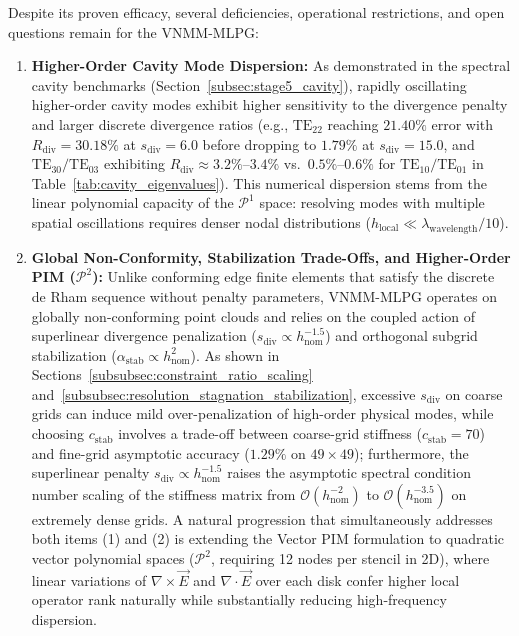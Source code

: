 \documentclass[preprint,12pt]{elsarticle}
\begin{document}
Despite its proven efficacy, several deficiencies, operational restrictions, and open questions remain for the VNMM-MLPG:
\begin{enumerate}
    \item \textbf{Higher-Order Cavity Mode Dispersion:} As demonstrated in the spectral cavity benchmarks (Section~\ref{subsec:stage5_cavity}), rapidly oscillating higher-order cavity modes exhibit higher sensitivity to the divergence penalty and larger discrete divergence ratios (e.g., $\mathrm{TE}_{22}$ reaching $21.40\%$ error with $R_{\mathrm{div}} = 30.18\%$ at $s_{\mathrm{div}} = 6.0$ before dropping to $1.79\%$ at $s_{\mathrm{div}} = 15.0$, and $\mathrm{TE}_{30}/\mathrm{TE}_{03}$ exhibiting $R_{\mathrm{div}} \approx 3.2\%\text{--}3.4\%$ vs.\ $0.5\%\text{--}0.6\%$ for $\mathrm{TE}_{10}/\mathrm{TE}_{01}$ in Table~\ref{tab:cavity_eigenvalues}). This numerical dispersion stems from the linear polynomial capacity of the $\mathcal{P}^1$ space: resolving modes with multiple spatial oscillations requires denser nodal distributions ($h_{\mathrm{local}} \ll \lambda_{\mathrm{wavelength}} / 10$).
    \item \textbf{Global Non-Conformity, Stabilization Trade-Offs, and Higher-Order PIM ($\mathcal{P}^2$):} Unlike conforming edge finite elements that satisfy the discrete de Rham sequence without penalty parameters, VNMM-MLPG operates on globally non-conforming point clouds and relies on the coupled action of superlinear divergence penalization ($s_{\mathrm{div}} \propto h_{\mathrm{nom}}^{-1.5}$) and orthogonal subgrid stabilization ($\alpha_{\mathrm{stab}} \propto h_{\mathrm{nom}}^2$). As shown in Sections~\ref{subsubsec:constraint_ratio_scaling} and~\ref{subsubsec:resolution_stagnation_stabilization}, excessive $s_{\mathrm{div}}$ on coarse grids can induce mild over-penalization of high-order physical modes, while choosing $c_{\mathrm{stab}}$ involves a trade-off between coarse-grid stiffness ($c_{\mathrm{stab}} = 70$) and fine-grid asymptotic accuracy ($1.29\%$ on $49\times 49$); furthermore, the superlinear penalty $s_{\mathrm{div}} \propto h_{\mathrm{nom}}^{-1.5}$ raises the asymptotic spectral condition number scaling of the stiffness matrix from $\mathcal{O}(h_{\mathrm{nom}}^{-2})$ to $\mathcal{O}(h_{\mathrm{nom}}^{-3.5})$ on extremely dense grids. A natural progression that simultaneously addresses both items (1) and (2) is extending the Vector PIM formulation to quadratic vector polynomial spaces ($\mathcal{P}^2$, requiring 12 nodes per stencil in 2D), where linear variations of $\nabla \times \vec{E}$ and $\nabla \cdot \vec{E}$ over each disk confer higher local operator rank naturally while substantially reducing high-frequency dispersion.

\end{enumerate}
\end{document}
